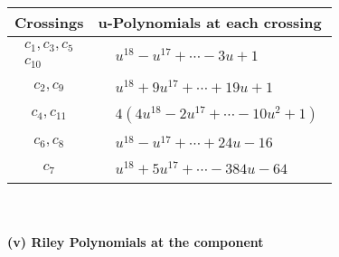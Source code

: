 \documentclass[1p]{elsarticle_modified}
\theoremstyle{definition}
\begin{document}
\begin{tabular}{m{50pt}|m{274pt}}
Crossings & \hspace{64pt}u-Polynomials at each crossing \\
\hline $$\begin{aligned}c_{1},c_{3},c_{5}\\c_{10}\end{aligned}$$&$\begin{aligned}
&u^{18}- u^{17}+\cdots-3 u+1
\end{aligned}$\\
\hline $$\begin{aligned}c_{2},c_{9}\end{aligned}$$&$\begin{aligned}
&u^{18}+9 u^{17}+\cdots+19 u+1
\end{aligned}$\\
\hline $$\begin{aligned}c_{4},c_{11}\end{aligned}$$&$\begin{aligned}
&4(4 u^{18}-2 u^{17}+\cdots-10 u^2+1)
\end{aligned}$\\
\hline $$\begin{aligned}c_{6},c_{8}\end{aligned}$$&$\begin{aligned}
&u^{18}- u^{17}+\cdots+24 u-16
\end{aligned}$\\
\hline $$\begin{aligned}c_{7}\end{aligned}$$&$\begin{aligned}
&u^{18}+5 u^{17}+\cdots-384 u-64
\end{aligned}$\\
\hline
\end{tabular}\\~\\
\newpage\renewcommand{\arraystretch}{1}
\flushleft \textbf{(v) Riley Polynomials at the component}\newline \\
\end{document}
